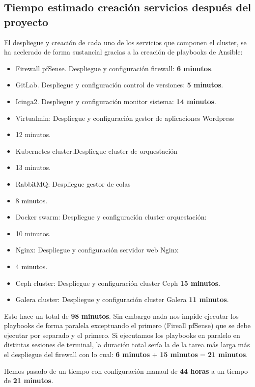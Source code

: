 \subsection{Tiempo estimado creación servicios después del proyecto}
\begin{text}
	El despliegue y creación de cada uno de los servicios que componen el cluster, se ha acelerado de forma sustancial gracias a la creación de playbooks de Ansible:
	\begin{itemize}
		\item Firewall pfSense. Despliegue y configuración firewall: \textbf{6 minutos}.
		\item GitLab. Despliegue y configuración control de versiones: \textbf{5 minutos}.
		\item Icinga2. Despliegue y configuración monitor sistema: \textbf{14 minutos}.
		\item Virtualmin: Despliegue y configuración gestor de aplicaciones Wordpress \item{12 minutos}.
		\item Kubernetes cluster.Despliegue cluster de orquestación \item{13 minutos}.
		\item RabbitMQ: Despliegue gestor de colas \item{8 minutos}.
		\item Docker swarm: Despliegue y configuración cluster orquestación: \item{10 minutos}.
		\item Nginx: Despliegue y configuración servidor web Nginx \item{4 minutos}.
		\item Ceph cluster: Despliegue y configuración cluster Ceph \textbf{15 minutos}.
		\item Galera cluster: Despliegue y configuración cluster Galera \textbf{11 minutos}.
	\end{itemize}

	Esto hace un total de \textbf{98 minutos}. Sin embargo nada nos impide ejecutar los playbooks de forma paralela exceptuando el primero (Fireall pfSense) que se debe ejecutar por separado y el primero. Si ejecutamos los playbooks en paralelo en distintas sesiones de terminal, la duración total sería la de la tarea más larga más el despliegue del firewall con lo cual: \textbf{6 minutos} + \textbf{15 minutos} = \textbf{21 minutos}.
	
	Hemos pasado de un tiempo con configuración manaul de \textbf{44 horas} a un tiempo de \textbf{21 minutos}.
\end{text}
